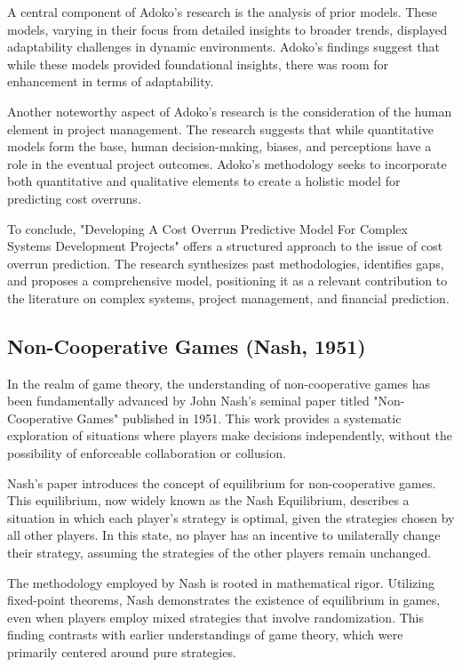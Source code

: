 \documentclass[sn-nature]{sn-jnl}%
\theoremstyle{thmstyleone}%
\theoremstyle{thmstyletwo}%
\theoremstyle{thmstylethree}%
\begin{document}
A central component of Adoko's research is the analysis of prior models. These models, varying in their focus from detailed insights to broader trends, displayed adaptability challenges in dynamic environments. Adoko's findings suggest that while these models provided foundational insights, there was room for enhancement in terms of adaptability.

Another noteworthy aspect of Adoko's research is the consideration of the human element in project management. The research suggests that while quantitative models form the base, human decision-making, biases, and perceptions have a role in the eventual project outcomes. Adoko's methodology seeks to incorporate both quantitative and qualitative elements to create a holistic model for predicting cost overruns.

To conclude, "Developing A Cost Overrun Predictive Model For Complex Systems Development Projects" offers a structured approach to the issue of cost overrun prediction. The research synthesizes past methodologies, identifies gaps, and proposes a comprehensive model, positioning it as a relevant contribution to the literature on complex systems, project management, and financial prediction.
\subsection{Non-Cooperative Games (Nash, 1951)\cite{nash_non-cooperative_1951}}
In the realm of game theory, the understanding of non-cooperative games has been fundamentally advanced by John Nash's seminal paper titled "Non-Cooperative Games" published in 1951. This work provides a systematic exploration of situations where players make decisions independently, without the possibility of enforceable collaboration or collusion.

Nash's paper introduces the concept of equilibrium for non-cooperative games. This equilibrium, now widely known as the Nash Equilibrium, describes a situation in which each player's strategy is optimal, given the strategies chosen by all other players. In this state, no player has an incentive to unilaterally change their strategy, assuming the strategies of the other players remain unchanged.

The methodology employed by Nash is rooted in mathematical rigor. Utilizing fixed-point theorems, Nash demonstrates the existence of equilibrium in games, even when players employ mixed strategies that involve randomization. This finding contrasts with earlier understandings of game theory, which were primarily centered around pure strategies.
\end{document}

